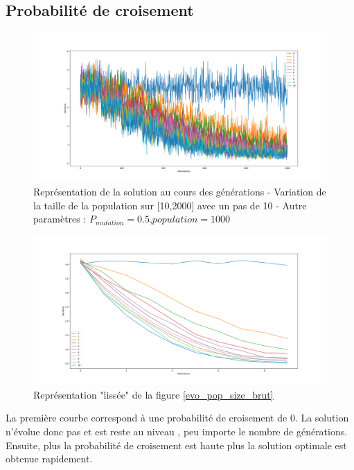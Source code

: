 \documentclass[12pt]{report}
\begin{document}
      \subsection{Probabilité de croisement}

      \begin{figure}[h]
        \centering
        \includegraphics[width=15cm]{img/evo_crossover_brut.png}
        \caption{Représentation de la solution au cours des générations - Variation de la taille de la population sur [10,2000] avec un pas de 10 - Autre paramètres : $P_{mutation} = 0.5$,$population = 1000$}
        \label{evo_crossover_brut}
      \end{figure}

      \begin{figure}[!]
        \centering
        \includegraphics[width=15cm]{img/evo_crossover_moy.png}
        \caption{Représentation "lissée" de la figure \ref{evo_pop_size_brut}}
        \label{evo_crossover_moy}
      \end{figure}

      La première courbe correspond à une probabilité de croisement de 0. La solution n'évolue donc pas et est reste au niveau , peu importe le nombre de générations. Ensuite, plus la probabilité de croisement est haute plus la solution optimale est obtenue rapidement.
\end{document}
